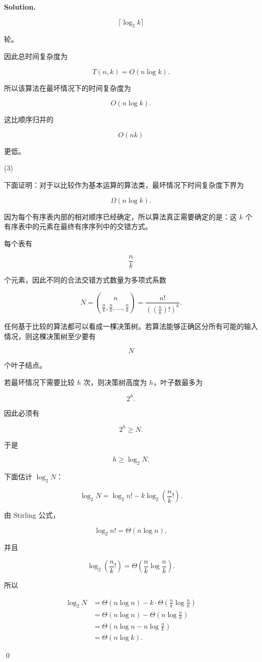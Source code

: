 \documentclass[11pt]{article}
\newenvironment{solution}{
\par\noindent\textbf{Solution.}\par\noindent
}{\qed}
\begin{document}
\begin{solution}
\[
\lceil \log_2 k\rceil
\]

轮。

因此总时间复杂度为

\[
T(n,k)=O(n\log k).
\]

所以该算法在最坏情况下的时间复杂度为

\[
O(n\log k).
\]

这比顺序归并的

\[
O(nk)
\]

更低。

(3)

下面证明：对于以比较作为基本运算的算法类，最坏情况下时间复杂度下界为

\[
\Omega(n\log k).
\]

因为每个有序表内部的相对顺序已经确定，所以算法真正需要确定的是：这 $k$ 个有序表中的元素在最终有序序列中的交错方式。

每个表有

\[
\frac{n}{k}
\]

个元素，因此不同的合法交错方式数量为多项式系数

\[
N
=
\binom{n}{\frac{n}{k},\frac{n}{k},\ldots,\frac{n}{k}}
=
\frac{n!}{\left(\left(\frac{n}{k}\right)!\right)^k}.
\]

任何基于比较的算法都可以看成一棵决策树。若算法能够正确区分所有可能的输入情况，则这棵决策树至少要有

\[
N
\]

个叶子结点。

若最坏情况下需要比较 $h$ 次，则决策树高度为 $h$，叶子数最多为

\[
2^h.
\]

因此必须有

\[
2^h \geq N.
\]

于是

\[
h\geq \log_2 N.
\]

下面估计 $\log_2 N$：

\[
\log_2 N
=
\log_2 n!
-
k\log_2\left(\frac{n}{k}!\right).
\]

由 Stirling 公式，

\[
\log_2 n! = \Theta(n\log n),
\]

并且

\[
\log_2\left(\frac{n}{k}!\right)
=
\Theta\left(\frac{n}{k}\log\frac{n}{k}\right).
\]

所以

\[
\begin{aligned}
\log_2 N
&=
\Theta(n\log n)
-
k\cdot
\Theta\left(\frac{n}{k}\log\frac{n}{k}\right)\\
&=
\Theta(n\log n)
-
\Theta\left(n\log\frac{n}{k}\right)\\
&=
\Theta\left(n\log n-n\log\frac{n}{k}\right)\\
&=
\Theta(n\log k).
\end{aligned}
\]


\end{solution}
\end{document}
